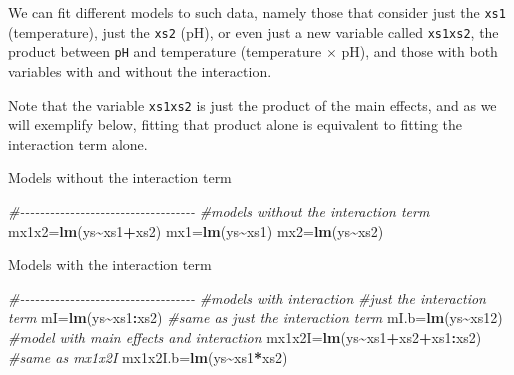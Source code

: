 \documentclass[
]{book}
\newenvironment{Shaded}{\begin{snugshade}}{\end{snugshade}}
\newcommand{\CommentTok}[1]{\textcolor[rgb]{0.56,0.35,0.01}{\textit{#1}}}
\newcommand{\FunctionTok}[1]{\textcolor[rgb]{0.13,0.29,0.53}{\textbf{#1}}}
\newcommand{\NormalTok}[1]{#1}
\newcommand{\OtherTok}[1]{\textcolor[rgb]{0.56,0.35,0.01}{#1}}
\newcommand{\SpecialCharTok}[1]{\textcolor[rgb]{0.81,0.36,0.00}{\textbf{#1}}}
\begin{document}
We can fit different models to such data, namely those that consider just the \texttt{xs1} (temperature), just the \texttt{xs2} (pH), or even just a new variable called \texttt{xs1xs2}, the product between \texttt{pH} and temperature (temperature \(\times\) pH), and those with both variables with and without the interaction.

Note that the variable \texttt{xs1xs2} is just the product of the main effects, and as we will exemplify below, fitting that product alone is equivalent to fitting the interaction term alone.

Models without the interaction term

\begin{Shaded}
\begin{Highlighting}[]
\CommentTok{\#{-}{-}{-}{-}{-}{-}{-}{-}{-}{-}{-}{-}{-}{-}{-}{-}{-}{-}{-}{-}{-}{-}{-}{-}{-}{-}{-}{-}{-}{-}{-}{-}{-}{-}{-}}
\CommentTok{\#models without the interaction term}
\NormalTok{mx1x2}\OtherTok{=}\FunctionTok{lm}\NormalTok{(ys}\SpecialCharTok{\textasciitilde{}}\NormalTok{xs1}\SpecialCharTok{+}\NormalTok{xs2)}
\NormalTok{mx1}\OtherTok{=}\FunctionTok{lm}\NormalTok{(ys}\SpecialCharTok{\textasciitilde{}}\NormalTok{xs1)}
\NormalTok{mx2}\OtherTok{=}\FunctionTok{lm}\NormalTok{(ys}\SpecialCharTok{\textasciitilde{}}\NormalTok{xs2)}
\end{Highlighting}
\end{Shaded}

Models with the interaction term

\begin{Shaded}
\begin{Highlighting}[]
\CommentTok{\#{-}{-}{-}{-}{-}{-}{-}{-}{-}{-}{-}{-}{-}{-}{-}{-}{-}{-}{-}{-}{-}{-}{-}{-}{-}{-}{-}{-}{-}{-}{-}{-}{-}{-}{-}}
\CommentTok{\#models with interaction}
\CommentTok{\#just the interaction term}
\NormalTok{mI}\OtherTok{=}\FunctionTok{lm}\NormalTok{(ys}\SpecialCharTok{\textasciitilde{}}\NormalTok{xs1}\SpecialCharTok{:}\NormalTok{xs2)}
\CommentTok{\#same as just the interaction term}
\NormalTok{mI.b}\OtherTok{=}\FunctionTok{lm}\NormalTok{(ys}\SpecialCharTok{\textasciitilde{}}\NormalTok{xs12)}
\CommentTok{\#model with main effects and interaction}
\NormalTok{mx1x2I}\OtherTok{=}\FunctionTok{lm}\NormalTok{(ys}\SpecialCharTok{\textasciitilde{}}\NormalTok{xs1}\SpecialCharTok{+}\NormalTok{xs2}\SpecialCharTok{+}\NormalTok{xs1}\SpecialCharTok{:}\NormalTok{xs2)}
\CommentTok{\#same as mx1x2I}
\NormalTok{mx1x2I.b}\OtherTok{=}\FunctionTok{lm}\NormalTok{(ys}\SpecialCharTok{\textasciitilde{}}\NormalTok{xs1}\SpecialCharTok{*}\NormalTok{xs2)}
\end{Highlighting}
\end{Shaded}
\end{document}
